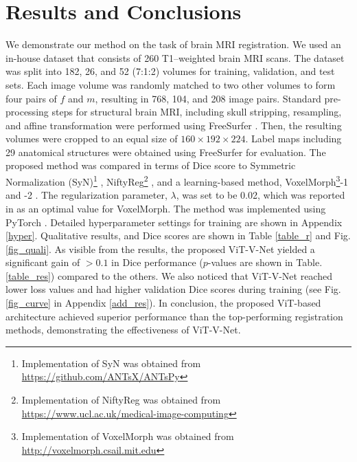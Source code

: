 \documentclass{midl}
\begin{document}
\section{Results and Conclusions}
\vspace{-1.5mm}
We demonstrate our method on the task of brain MRI registration. We used an in-house dataset that consists of 260 T1–weighted brain MRI scans. The dataset was split into 182, 26, and 52 (7:1:2) volumes for training, validation, and test sets. Each image volume was randomly matched to two other volumes to form four pairs of $f$ and $m$, resulting in 768, 104, and 208 image pairs. Standard pre-processing steps for structural brain MRI, including skull stripping, resampling, and affine transformation were performed using FreeSurfer \cite{fischl2012freesurfer}. Then, the resulting volumes were cropped to an equal size of $160\times192\times 224$. Label maps including 29 anatomical structures were obtained using FreeSurfer for evaluation. The proposed method was compared in terms of Dice score \cite{dice1945measures} to Symmetric Normalization (SyN)\footnote{Implementation of SyN was obtained from \url{https://github.com/ANTsX/ANTsPy}} \cite{avants2008symmetric}, NiftyReg\footnote{Implementation of NiftyReg was obtained from \url{https://www.ucl.ac.uk/medical-image-computing}} \cite{modat2010fast}, and a learning-based method, VoxelMorph\footnote{Implementation of VoxelMorph was obtained from \url{http://voxelmorph.csail.mit.edu}}-1 and -2 \cite{balakrishnan2018unsupervised}. The regularization parameter, $\lambda$, was set to be 0.02, which was reported in \cite{balakrishnan2018unsupervised} as an optimal value for VoxelMorph. The method was implemented using PyTorch \cite{NEURIPS2019_9015}. Detailed hyperparameter settings for training are shown in Appendix \ref{hyper}. Qualitative results, and Dice scores are shown in Table \ref{table_r} and Fig. \ref{fig_quali}. As visible from the results, the proposed ViT-V-Net yielded a significant gain of $>0.1$ in Dice performance ($p$-values are shown in Table. \ref{table_res}) compared to the others. We also noticed that ViT-V-Net reached lower loss values and had higher validation Dice scores during training (see Fig. \ref{fig_curve} in Appendix \ref{add_res}). In conclusion, the proposed ViT-based architecture achieved superior performance than the top-performing registration methods, demonstrating the effectiveness of ViT-V-Net.


\end{document}
